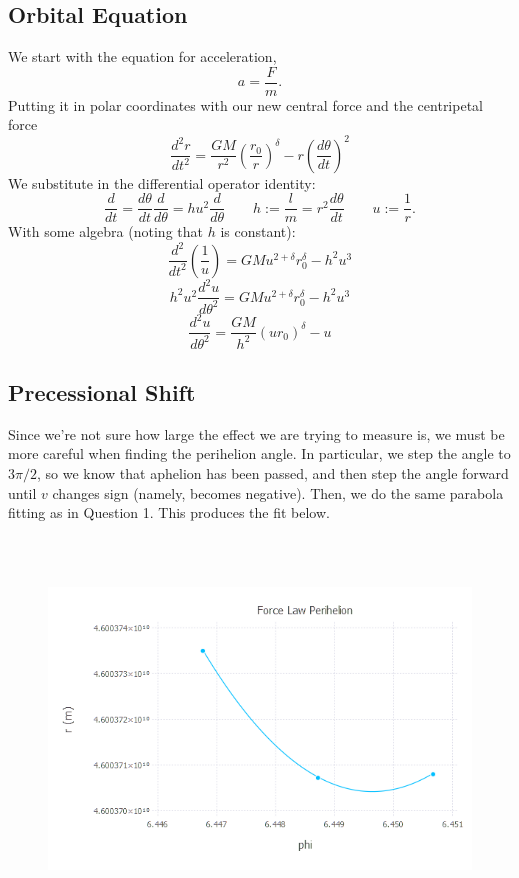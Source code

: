 \documentclass{article}
\begin{document}
\subsection{Orbital Equation}
We start with the equation for acceleration,
$$a = \frac{F}{m}.$$
Putting it in polar coordinates with our new central force and the centripetal force
$$\frac{d^2r}{dt^2} = \frac{GM}{r^2}(\frac{r_0}{r})^\delta - r(\frac{d\theta}{dt})^2$$
We substitute in the differential operator identity:
$$\frac{d}{dt} = \frac{d\theta}{dt}\frac{d}{d\theta}=hu^2\frac{d}{d\theta} \qquad h := \frac{l}{m} = r^2\frac{d\theta}{dt} \qquad u := \frac{1}{r}.$$
With some algebra (noting that $h$ is constant):
$$\frac{d^2}{dt^2}(\frac{1}{u}) = GMu^{2+\delta}r_0^\delta - h^2u^3$$
$$h^2u^2\frac{d^2u}{d\theta^2} = GMu^{2+\delta}r_0^\delta - h^2u^3$$
$$\frac{d^2u}{d\theta^2} = \frac{GM}{h^2}(ur_0)^\delta - u$$
\subsection{Precessional Shift}
Since we're not sure how large the effect we are trying to measure is, we must be more careful when finding the perihelion angle. In particular, we step the angle to $3\pi/2$, so we know that aphelion has been passed, and then step the angle forward until $v$ changes sign (namely, becomes negative). Then, we do the same parabola fitting as in Question 1. This produces the fit below.

\begin{figure}[H]
	\includegraphics[width=6in,height=4in]{"Question 2 Perihelion"}
\end{figure}
\end{document}

